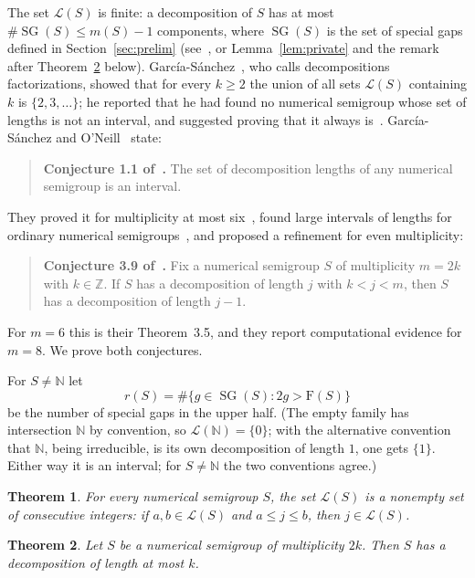 \documentclass[11pt]{article}
\newtheorem{theorem}{Theorem}
\theoremstyle{definition}
\theoremstyle{remark}
\newcommand{\N}{\mathbb N}
\DeclareMathOperator{\SG}{SG}
\newcommand{\F}{\mathrm F}
\begin{document}
The set $\mathcal L(S)$ is finite: a decomposition of $S$ has at most
$\#\SG(S)\le m(S)-1$ components, where $\SG(S)$ is the set of special gaps
defined in Section~\ref{sec:prelim} (see~\cite[Section~2]{go}, or
Lemma~\ref{lem:private} and the remark after Theorem~\ref{thm:even} below). García-Sánchez~\cite{g}, who calls
decompositions factorizations, showed that for every $k\ge2$ the union of all
sets $\mathcal L(S)$ containing $k$ is $\{2,3,\dots\}$; he reported that he had
found no numerical semigroup whose set of lengths is not an interval, and suggested
proving that it always is~\cite[Section~3]{g}. García-Sánchez and
O'Neill~\cite{go} state:

\begin{quote}
\textbf{Conjecture 1.1 of~\cite{go}.} The set of decomposition lengths of any
numerical semigroup is an interval.
\end{quote}

\noindent They proved it for multiplicity at most six~\cite[Section~3]{go},
found large intervals of lengths for ordinary numerical
semigroups~\cite[Section~4]{go}, and proposed a refinement for even
multiplicity:

\begin{quote}
\textbf{Conjecture 3.9 of~\cite{go}.} Fix a numerical semigroup $S$ of
multiplicity $m=2k$ with $k\in\mathbb Z$. If $S$ has a decomposition of
length $j$ with $k<j<m$, then $S$ has a decomposition of length $j-1$.
\end{quote}

\noindent For $m=6$ this is their Theorem~3.5, and they report computational
evidence for $m=8$. We prove both conjectures.

For $S\ne\N$ let
\[
r(S)=\#\{g\in\SG(S): 2g>\F(S)\}
\]
be the number of special gaps in the upper half. (The empty family has
intersection $\N$ by convention, so $\mathcal L(\N)=\{0\}$; with the
alternative convention that $\N$, being irreducible, is its own decomposition
of length $1$, one gets $\{1\}$. Either way it is an interval; for $S\ne\N$
the two conventions agree.)

\begin{theorem}\label{thm:interval}
For every numerical semigroup $S$, the set $\mathcal L(S)$ is a nonempty set
of consecutive integers: if $a,b\in\mathcal L(S)$ and $a\le j\le b$, then
$j\in\mathcal L(S)$.
\end{theorem}

\begin{theorem}\label{thm:even}
Let $S$ be a numerical semigroup of multiplicity $2k$. Then $S$ has a
decomposition of length at most $k$.
\end{theorem}
\end{document}
